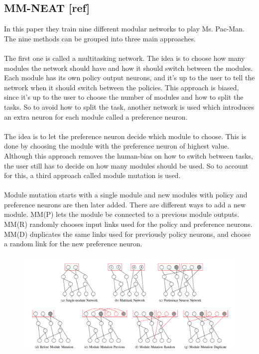 \documentclass[11pt, a4paper]{article}
\begin{document}
\subsection{MM-NEAT [ref]}
In this paper they train nine different modular networks to play Ms. Pac-Man. The nine methods can be grouped into three main approaches. 
\\ 
\\
The first one is called a multitasking network. The idea is to choose how many modules the network should have and how it should switch between the modules. Each module has its own policy output neurons, and it’s up to the user to tell the network when it should switch between the policies. This approach is biased, since it’s up to the user to choose the number of modules and how to split the tasks. So to avoid how to split the task, another network is used which introduces an extra neuron for each module called a preference neuron. 
\\ 
\\
The idea is to let the preference neuron decide which module to choose. This is done by choosing the module with the preference neuron of highest value. Although this approach removes the human-bias on how to switch between tasks, the user still has to decide on how many modules should be used. So to account for this, a third approach called module mutation is used.
\\ 
\\
Module mutation starts with a single module and new modules with policy and preference neurons are then later added. There are different ways to add a new module. MM(P) lets the module be connected to a previous module outputs. MM(R) randomly chooses input links used for the policy and preference neurons. MM(D) duplicates the same links used for previously policy neurons, and choose a random link for the new preference neuron.
\begin{figure}[!ht]
\centering
\includegraphics[scale=0.45]{MM-NEAT}
\caption{}
\end{figure}
\end{document}

